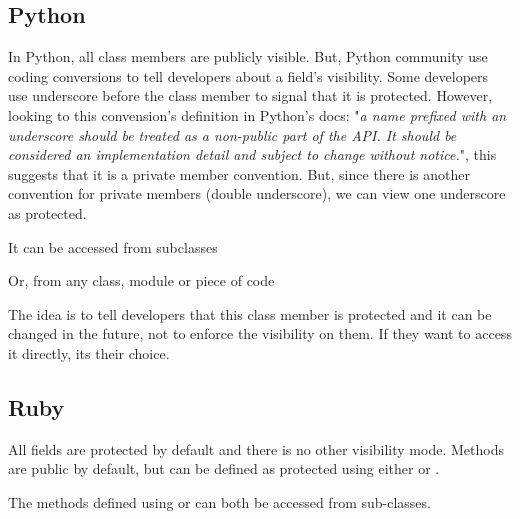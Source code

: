 \documentclass{KodeBook}
\begin{document}


\subsection{Python}

In Python, all class members are publicly visible. 
But, Python community use coding conversions to tell developers about a field's visibility. 
Some developers use underscore \keyword{\_} before the class member to signal that it is protected. 
However, looking to this convension's definition in Python's docs: "\textit{a name prefixed with an underscore should be treated as a non-public part of the API. It should be considered an implementation detail and subject to change without notice.}", this suggests that it is a private member convention.
But, since there is another convention for private members (double underscore), we can view one underscore as protected.



It can be accessed from subclasses



Or, from any class, module or piece of code 



The idea is to tell developers that this class member is protected and it can be changed in the future, not to enforce the visibility on them. 
If they want to access it directly, its their choice.

\subsection{Ruby}

All fields are protected by default and there is no other visibility mode. 
Methods are public by default, but can be defined as protected using either  or . 



The methods defined using  or  can both be accessed from sub-classes.
\end{document}
